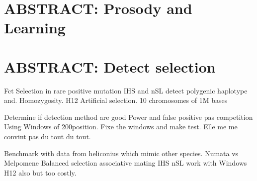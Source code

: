 \documentclass[10pt,letterpaper]{article}
\begin{document}
\section{ABSTRACT: Prosody and Learning}

\section{ABSTRACT: Detect selection}
Fct
Selection in rare positive mutation
IHS and nSL detect polygenic haplotype and. Homozygosity.
H12
Artificial selection.
10 chromosomes of 1M bases


Determine if detection method are good
Power and false positive pas competition
Using Windows of 200position.
Fixe the windows and make test.
Elle me me convint pas du tout du tout.


Benchmark with data from heliconius which mimic other species.
Numata vs Melpomene
Balanced selection associative mating
IHS nSL work with Windows
H12 also but too costly.
\end{document}
